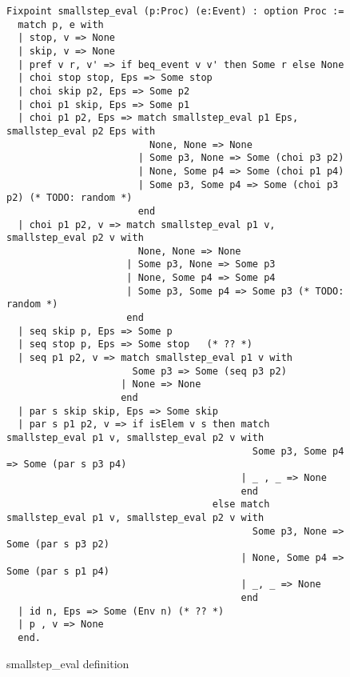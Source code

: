 \documentclass{comjnl}
\begin{document}
\begin{figure*}
\caption{\label{fig:my-label} smallstep\_eval definition}
\begin{verbatim}
Fixpoint smallstep_eval (p:Proc) (e:Event) : option Proc :=
  match p, e with 
  | stop, v => None
  | skip, v => None
  | pref v r, v' => if beq_event v v' then Some r else None
  | choi stop stop, Eps => Some stop
  | choi skip p2, Eps => Some p2
  | choi p1 skip, Eps => Some p1
  | choi p1 p2, Eps => match smallstep_eval p1 Eps, smallstep_eval p2 Eps with
                         None, None => None
                       | Some p3, None => Some (choi p3 p2)
                       | None, Some p4 => Some (choi p1 p4)
                       | Some p3, Some p4 => Some (choi p3 p2) (* TODO: random *)
                       end
  | choi p1 p2, v => match smallstep_eval p1 v, smallstep_eval p2 v with
                       None, None => None
                     | Some p3, None => Some p3
                     | None, Some p4 => Some p4
                     | Some p3, Some p4 => Some p3 (* TODO: random *)
                     end
  | seq skip p, Eps => Some p
  | seq stop p, Eps => Some stop   (* ?? *)
  | seq p1 p2, v => match smallstep_eval p1 v with
                      Some p3 => Some (seq p3 p2)
                    | None => None
                    end
  | par s skip skip, Eps => Some skip
  | par s p1 p2, v => if isElem v s then match smallstep_eval p1 v, smallstep_eval p2 v with
                                           Some p3, Some p4 => Some (par s p3 p4)
                                         | _ , _ => None
                                         end
                                    else match smallstep_eval p1 v, smallstep_eval p2 v with
                                           Some p3, None => Some (par s p3 p2)
                                         | None, Some p4 => Some (par s p1 p4)
                                         | _, _ => None
                                         end
  | id n, Eps => Some (Env n) (* ?? *)
  | p , v => None
  end.
\end{verbatim}
\end{figure*}
\end{document}
